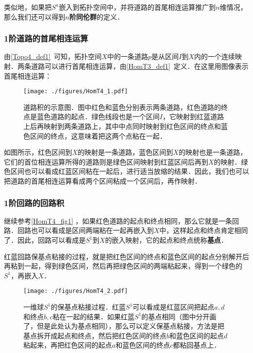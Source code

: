 类似地，如果把$S^n$嵌入到拓扑空间中，并将道路的首尾相连运算推广到$n$维情况，那么我们还可以得到$n$\textbf{阶同伦群}的定义．

\subsubsection{1阶道路的首尾相连运算}

由\autoref{Topo4_def1}~可知，拓扑空间$X$中的一条道路$p$是从区间$I$到$X$内的一个连续映射．两条道路可以进行首尾相连运算，由\autoref{HomT3_def1}~定义．在这里用图像表示首尾相连运算：


\begin{figure}[ht]
\centering
\texttt{[image: ./figures/HomT4\_1.pdf]}
\caption{道路积的示意图．图中红色和蓝色分别表示两条道路，红色道路的终点是蓝色道路的起点．绿色线段也是一个区间$I$，它映射到红蓝道路上后再映射到两条道路上，其中中点同时映射到红色区间的终点和蓝色区间的终点，这意味着把这两个点粘在一起．} \label{HomT4_fig1}
\end{figure}

如图所示，红色区间到$X$的映射是一条道路，蓝色区间到$X$的映射也是一条道路，它们的首位相连运算所得的道路则是绿色区间映射到红蓝区间后再到$X$的映射．绿色区间也可以看成红蓝区间粘在一起后，进行适当放缩的结果．因此，我们也可以把道路的首尾相连运算看成两个区间粘成一个区间后，再作映射．

\subsubsection{1阶回路的回路积}

继续参考\autoref{HomT4_fig1} ，如果红色道路的起点和终点相同，那么它就是一条回路．回路也可以看成是区间两端粘在一起再嵌入到$X$中，这样起点和终点肯定相同了．因此，回路可以看成是$S^1$到$X$的嵌入映射，它的起点和终点统称\textbf{基点}．

红蓝回路保基点粘接的过程，就是把红色区间的终点和蓝色区间的起点分别解开后再粘到一起，得到绿色区间，然后再把绿色区间的两端粘起来，得到一个绿色的$S^1$，再嵌入$X$．

\begin{figure}[ht]
\centering
\texttt{[image: ./figures/HomT4\_2.pdf]}
\caption{一维球$S^1$的保基点粘接过程．红蓝$S^1$可以看成是红蓝区间把起点$a, d$和终点$b, c$粘在一起的结果．如果红蓝$S^1$的基点相同（图中分开画了，但是此处认为基点相同），那么可以定义保基点粘接，方法是把基点拆开成起点和终点，然后把红色区间的终点$b$和蓝色区间的起点$d$粘起来，再把红色区间的起点$a$和蓝色区间的终点$c$都粘回基点上．} \label{HomT4_fig2}
\end{figure}

